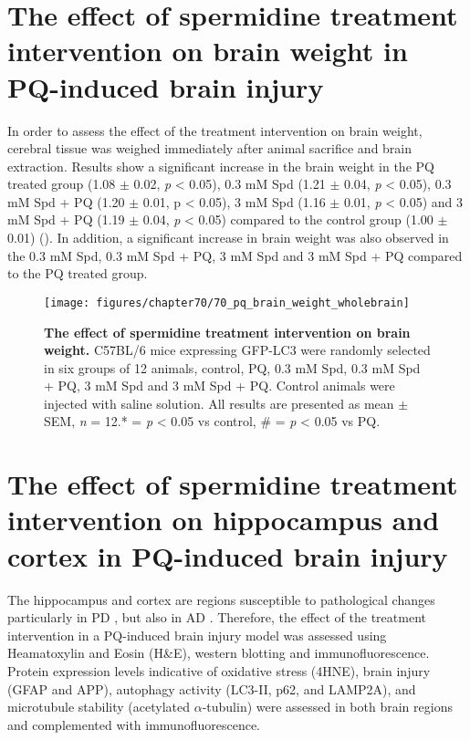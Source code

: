 \section{The effect of spermidine treatment intervention on brain weight in PQ-induced brain injury}
In order to assess the effect of the treatment intervention on brain weight, cerebral tissue was weighed immediately after animal sacrifice and brain extraction. Results show a significant increase in the brain weight in the PQ treated group (1.08 $\pm$ 0.02, \textit{p} < 0.05), 0.3 mM Spd (1.21 $\pm$ 0.04, \textit{p} < 0.05), 0.3 mM Spd + PQ (1.20 $\pm$ 0.01, p < 0.05), 3 mM Spd (1.16 $\pm$ 0.01, \textit{p} < 0.05) and 3 mM Spd + PQ (1.19 $\pm$ 0.04, \textit{p} < 0.05) compared to the control group (1.00 $\pm$ 0.01) (). In addition, a significant increase in brain weight was also observed in the 0.3 mM Spd, 0.3 mM Spd + PQ, 3 mM Spd and 3 mM Spd + PQ compared to the PQ treated group. 

\begin{figure}[!htbp]
\center
  \texttt{[image: figures/chapter70/70\_pq\_brain\_weight\_wholebrain]}
  \caption[The effect of spermidine treatment intervention on brain weight]{\textbf{The effect of spermidine treatment intervention on brain weight.} C57BL/6 mice expressing GFP-LC3 were randomly selected in six groups of 12 animals, control, PQ, 0.3 mM Spd, 0.3 mM Spd + PQ, 3 mM Spd and 3 mM Spd + PQ. Control animals were injected with saline solution. All results are presented as mean $\pm$ SEM, \textit{n} = 12.* = \textit{p} < 0.05 vs control, \# = \textit{p} < 0.05 vs PQ.}
  \label{fig:70_pq_brain_weight_wholebrain}
\end{figure} 

\section{The effect of spermidine treatment intervention on hippocampus and cortex in PQ-induced brain injury}
The hippocampus and cortex are regions susceptible to pathological changes particularly in PD \citep{Braak2004, Braak1998}, but also in AD \citep{Braak2004,Braak1998,Braak1991,Braak2012}. Therefore, the effect of the treatment intervention in a PQ-induced brain injury model was assessed using Heamatoxylin and Eosin (H\&E), western blotting and immunofluorescence. Protein expression levels indicative of oxidative stress (4HNE), brain injury (GFAP and APP), autophagy activity (LC3-II, p62, and LAMP2A), and microtubule stability (acetylated $\alpha$-tubulin) were assessed in both brain regions and complemented with immunofluorescence.

